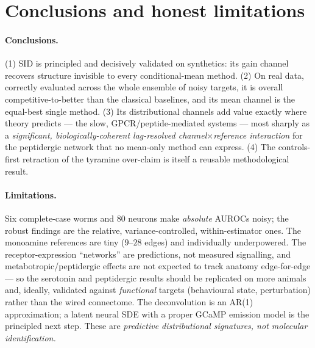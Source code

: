 \documentclass[11pt]{article}
\begin{document}
\section{Conclusions and honest limitations}
\label{sec:limits}

\paragraph{Conclusions.}
(1) SID is principled and decisively validated on synthetics: its gain channel recovers structure
invisible to every conditional-mean method. (2) On real data, correctly evaluated across the whole
ensemble of noisy targets, it is overall competitive-to-better than the classical baselines, and its
mean channel is the equal-best single method. (3) Its distributional channels add value exactly
where theory predicts --- the slow, GPCR/peptide-mediated systems --- most sharply as a
\emph{significant, biologically-coherent lag-resolved channel$\times$reference interaction} for the
peptidergic network that no mean-only method can express. (4) The controls-first retraction of the
tyramine over-claim is itself a reusable methodological result.

\paragraph{Limitations.}
Six complete-case worms and 80 neurons make \emph{absolute} AUROCs noisy; the robust findings are
the relative, variance-controlled, within-estimator ones. The monoamine references are tiny
($9$--$28$ edges) and individually underpowered. The receptor-expression ``networks'' are
predictions, not measured signalling, and metabotropic/peptidergic effects are not expected to track
anatomy edge-for-edge --- so the serotonin and peptidergic results should be replicated on more
animals and, ideally, validated against \emph{functional} targets (behavioural state, perturbation)
rather than the wired connectome. The deconvolution is an AR(1) approximation; a latent neural SDE
with a proper GCaMP emission model is the principled next step. These are \emph{predictive
distributional signatures, not molecular identification.}

\end{document}
